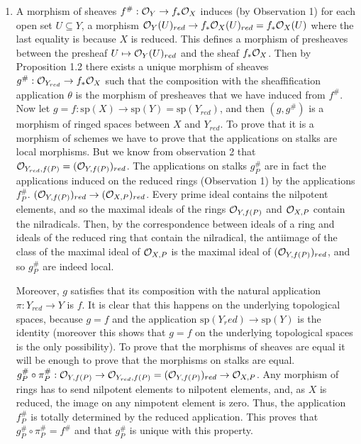 \begin{sol}
\begin{enumerate}[label=\alph*)]
		\item A morphism of sheaves $f^{\#}: \mathcal{O}_Y \to f_* \mathcal{O}_X$ induces (by Observation 1) for each open set $U \subseteq Y$, a morphism $\mathcal{O}_Y(U)_{red} \to f_* \mathcal{O}_X(U)_{red} = f_* \mathcal{O}_X(U)$ where the last equality is because $X$ is reduced. This defines a morphism of presheaves between the presheaf  $U \mapsto \mathcal{O}_Y(U)_{red}$ and the sheaf $f_* \mathcal{O}_X$.
		Then by Proposition 1.2 there exists a unique morphism of sheaves $g^{\#}: \mathcal{O}_{Y_{red}} \to f_*\mathcal{O}_X$ such that the composition with the sheaffification application $\theta$ is the morphism of presheaves that we have induced from $f^{\#}$. Now let $g = f: \mathrm{sp}(X) \to \mathrm{sp}(Y) = \mathrm{sp}(Y_{red})$, and then $(g, g^{\#})$ is a morphism of ringed spaces between $X$ and $Y_{red}$. To prove that it is a morphism of schemes we have to prove that the applications on stalks are local morphisms. But we know from observation 2 that $\mathcal{O}_{Y_{red}, f(P)} = (\mathcal{O}_{Y,f(P)})_{red}$. The applications on stalks $g^{\#}_P$ are in fact the applications induced on the reduced rings (Observation 1) by the applications $f^{\#}_P$. $(\mathcal{O}_{Y,f(P)})_{red} \to (\mathcal{O}_{X,P})_{red}$. Every prime ideal contains the nilpotent elements, and so the maximal ideals of the rings $\mathcal{O}_{Y,f(P)}$ and $\mathcal{O}_{X,P}$ contain the nilradicals. Then, by the correspondence between ideals of a ring and ideals of the reduced ring that contain the nilradical, the antiimage of the class of the maximal ideal of $\mathcal{O}_{X,P}$ is the maximal ideal of $(\mathcal{O}_{Y,f(P)})_{red}$, and so $g^{\#}_P$ are indeed local.

		Moreover, $g$ satisfies that its composition with the natural application $\pi: Y_{red} \to Y$ is $f$. It is clear that this happens on the underlying topological spaces, because $g = f$ and the application $\mathrm{sp}(Y_red) \to \mathrm{sp}(Y)$ is the identity (moreover this shows that $g = f$ on the underlying topological spaces is the only possibility). To prove that the morphisms of sheaves are equal it will be enough to prove that the morphisms on stalks are equal. $g^{\#}_P \circ \pi^{\#}_P: \mathcal{O}_{Y,f(P)} \to \mathcal{O}_{Y_{red}, f(P)} = (\mathcal{O}_{Y,f(P)})_{red} \to \mathcal{O}_{X,P}$. Any morphism of rings has to send nilpotent elements to nilpotent elements, and, as $X$ is reduced, the image on any nimpotent element is zero. Thus, the application $f^{\#}_P$ is totally determined by the reduced application. This proves that $g^{\#}_P \circ \pi^{\#}_P = f^{\#}$ and that $g^{\#}_P$ is unique with this property.  
	\end{enumerate}
\end{sol}

